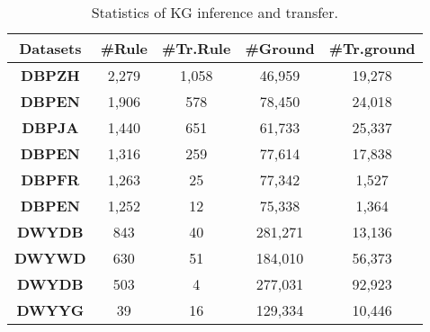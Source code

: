\documentclass[11pt,a4paper]{article}
\begin{document}
\begin{table}[htbp]
	\centering
	\small
	\setlength{\tabcolsep}{1.0pt}
	\renewcommand{\arraystretch}{1.0}
	\begin{tabular}{ccccc}
		\toprule
		\textbf{Datasets}      & \#\textbf{Rule} & \#\textbf{Tr.Rule} & \#\textbf{Ground} & \#\textbf{Tr.ground} \\
		\midrule
		\textbf{DBP{\tiny ZH}} & 2,279       & 1,058       & 46,959      & 19,278      \\
		\textbf{DBP{\tiny EN}} & 1,906       & 578         & 78,450      & 24,018      \\
		\midrule
		\textbf{DBP{\tiny JA}} & 1,440         & 651         & 61,733      & 25,337      \\
		\textbf{DBP{\tiny EN}} & 1,316       & 259         & 77,614      & 17,838      \\
		\midrule
		\textbf{DBP{\tiny FR}} & 1,263       & 25          & 77,342      & 1,527       \\
		\textbf{DBP{\tiny EN}} & 1,252       & 12          & 75,338      & 1,364       \\
		\midrule
		\textbf{DWY{\tiny DB}} & 843         & 40          & 281,271     & 13,136      \\
		\textbf{DWY{\tiny WD}} & 630         & 51          & 184,010     & 56,373      \\
		\midrule
		\textbf{DWY{\tiny DB}} & 503         & 4           & 277,031     & 92,923      \\
		\textbf{DWY{\tiny YG}} & 39          & 16          & 129,334     & 10,446      \\
		\bottomrule
	\end{tabular}
	\caption{Statistics of KG inference and transfer.}
	\label{tab:ruleset}
\end{table}
\end{document}
